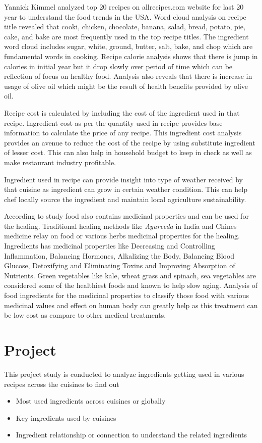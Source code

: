 \documentclass[sigconf]{acmart}
\begin{document}
Yannick Kimmel \cite{www-nyc} analyzed top 20 recipes on allrecipes.com website for last 20 year to understand the food trends in the USA. Word cloud analysis on recipe title revealed that cooki, chicken, chocolate, banana, salad, bread, potato, pie, cake, and bake are most frequently used in the top recipe titles. The ingredient word cloud includes sugar, white, ground, butter, salt, bake, and chop which are fundamental words in cooking. Recipe calorie analysis shows that there is jump in calories in initial year but it drop slowly over period of time which can be reflection of focus on healthy food. Analysis also reveals that there is increase in usage of olive oil which might be the result of health benefits provided by olive oil.

Recipe cost is calculated by including the cost of the ingredient used in that recipe. Ingredient cost as per the quantity used in recipe provides base information to calculate the price of any recipe. This ingredient cost analysis provides an avenue to reduce the cost of the recipe by using substitute ingredient of lesser cost. This can also help in household budget to keep in check as well as make restaurant industry profitable.

Ingredient used in recipe can provide insight into type of weather received by that cuisine as ingredient can grow in certain weather condition. This can help chef locally source the ingredient and maintain local agriculture sustainability.

According to study food also contains medicinal properties and can be used for the healing. Traditional healing methods like \emph{Ayurveda} in India and Chines medicine relay on food or various herbs medicinal properties for the healing. Ingredients has medicinal properties like Decreasing and Controlling Inflammation, Balancing Hormones, Alkalizing the Body, Balancing Blood Glucose, Detoxifying and Eliminating Toxins and Improving Absorption of Nutrients. Green vegetables like kale, wheat grass and spinach, sea vegetables are considered some of the healthiest foods and known to help slow aging. Analysis of food ingredients for the medicinal properties to classify those food with various medicinal values and effect on human body can greatly help as this treatment can be low cost as compare to other medical treatments. 

\section{Project}
This project study is conducted to analyze ingredients getting used in various recipes across the cuisines to find out
\begin{itemize}
\item Most used ingredients across cuisines or globally
\item Key ingredients used by cuisines
\item Ingredient relationship or connection to understand the related ingredients
\end{itemize}
\end{document}
